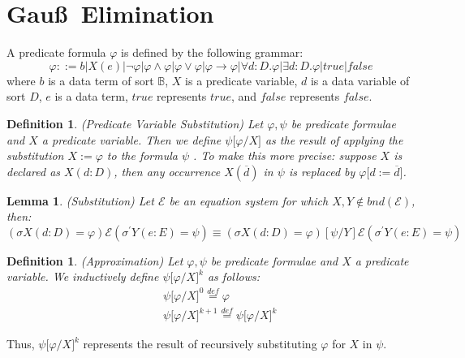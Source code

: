 \documentclass{article}
\newtheorem{definition}[theorem]{Definition}
\newtheorem{lemma}[theorem]{Lemma}
\begin{document}
\section{ Gau\ss\ Elimination}

A predicate formula $\varphi $ is defined by the following grammar:%
\begin{equation*}
\varphi ::=b|X(e)|\lnot \varphi |\varphi \wedge \varphi |\varphi \vee
\varphi |\varphi \rightarrow \varphi |\forall d:D.\varphi |\exists
d:D.\varphi |true |false
\end{equation*}%
where $b$ is a data term of sort $\mathbb{B}$, $X$ is a predicate variable, $%
d$ is a data variable of sort $D$, $e$ is a data term, $true $ represents $%
true$, and $false $ represents $false$.

\begin{definition}
(Predicate Variable Substitution) Let $\varphi ,\psi $ be predicate formulae
and $X$ a predicate variable. Then we define $\psi \lbrack \varphi /X]$ as
the result of applying the substitution $X:=\varphi $ to the formula $\psi $%
. To make this more precise: suppose $X$ is declared as $X(d:D)$, then any
occurrence $X(\overline{d})$ in $\psi $ is replaced by $\varphi \lbrack d:=%
\overline{d}]$.
\end{definition}

\begin{lemma}
(Substitution) Let $\mathcal{E}$ be an equation system for which $X,Y\notin
bnd(\mathcal{E})$, then:%
\begin{equation*}
(\sigma X(d:D)=\varphi )\mathcal{E}(\sigma ^{\prime }Y(e:E)=\psi )\equiv
(\sigma X(d:D)=\varphi )[\psi /Y]\mathcal{E}(\sigma ^{\prime }Y(e:E)=\psi )
\end{equation*}
\end{lemma}

\begin{definition}
(Approximation) Let $\varphi ,\psi $ be predicate formulae and $X$ a
predicate variable. We inductively define $\psi \lbrack \varphi /X]^{k}$ as
follows:%
\begin{eqnarray*}
&&\psi \lbrack \varphi /X]^{0}\overset{def}{=}\varphi \\
&&\psi \lbrack \varphi /X]^{k+1}\overset{def}{=}\psi \lbrack \varphi /X]^{k}
\end{eqnarray*}
\end{definition}

Thus, $\psi \lbrack \varphi /X]^{k}$ represents the result of recursively
substituting $\varphi $ for $X$ in $\psi $.
\end{document}
